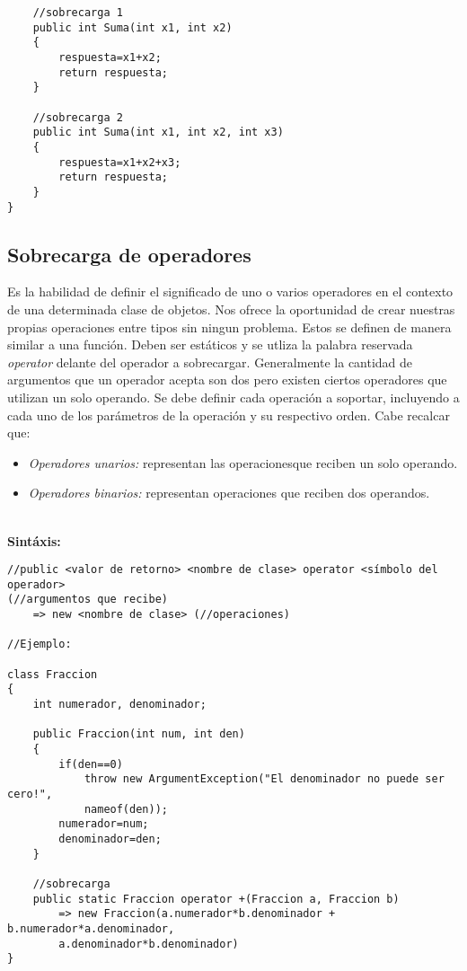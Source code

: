 \documentclass[letterpaper, 12pt]{article}
\begin{document}
\begin{justify}
\begin{verbatim}
    //sobrecarga 1
    public int Suma(int x1, int x2)
    {
        respuesta=x1+x2;
        return respuesta;
    }

    //sobrecarga 2
    public int Suma(int x1, int x2, int x3)
    {
        respuesta=x1+x2+x3;
        return respuesta;
    }
}
            \end{verbatim}
        \subsection{Sobrecarga de operadores}
        Es la habilidad de definir el significado de uno o varios operadores en el contexto de una determinada clase de objetos. Nos ofrece la oportunidad
        de crear nuestras propias operaciones entre tipos sin ningun problema. Estos se definen de manera similar a una función. Deben ser estáticos y se utliza la palabra reservada \emph{operator} delante del operador a sobrecargar.
        Generalmente la cantidad de argumentos que un operador acepta son dos pero existen ciertos operadores que utilizan un solo operando. Se debe definir cada operación
        a soportar, incluyendo a cada uno de los parámetros de la operación y su respectivo orden. Cabe recalcar que:
        \begin{itemize}
            \item \emph{Operadores unarios: }representan las operacionesque reciben un solo operando.
            \item \emph{Operadores binarios: }representan operaciones que reciben dos operandos.
        \end{itemize}
        \textbf{\\Sintáxis:}
            \begin{verbatim}
//public <valor de retorno> <nombre de clase> operator <símbolo del operador>
(//argumentos que recibe)
    => new <nombre de clase> (//operaciones)

//Ejemplo:

class Fraccion
{
    int numerador, denominador;

    public Fraccion(int num, int den)
    {
        if(den==0)
            throw new ArgumentException("El denominador no puede ser cero!", 
            nameof(den));
        numerador=num;
        denominador=den;
    }

    //sobrecarga
    public static Fraccion operator +(Fraccion a, Fraccion b)
        => new Fraccion(a.numerador*b.denominador + b.numerador*a.denominador, 
        a.denominador*b.denominador)
}
            \end{verbatim}
    \end{justify}
\end{document}
